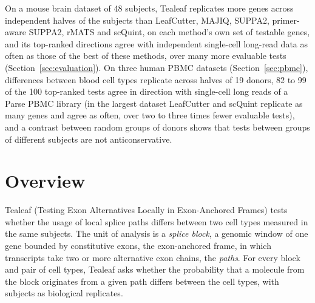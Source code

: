 \documentclass[11pt]{article}
\begin{document}
On a mouse brain dataset of 48 subjects, Tealeaf replicates more genes across independent halves of the subjects than LeafCutter, MAJIQ, SUPPA2, primer-aware SUPPA2, rMATS and scQuint, on each method's own set of testable genes, and its top-ranked directions agree with independent single-cell long-read data as often as those of the best of these methods, over many more evaluable tests (Section~\ref{sec:evaluation}). On three human PBMC datasets (Section~\ref{sec:pbmc}), differences between blood cell types replicate across halves of 19 donors, 82 to 99 of the 100 top-ranked tests agree in direction with single-cell long reads of a Parse PBMC library (in the largest dataset LeafCutter and scQuint replicate as many genes and agree as often, over two to three times fewer evaluable tests), and a contrast between random groups of donors shows that tests between groups of different subjects are not anticonservative.

\section{Overview}

Tealeaf (Testing Exon Alternatives Locally in Exon-Anchored Frames) tests whether the usage of local splice paths differs between two cell types measured in the same subjects. The unit of analysis is a \emph{splice block}, a genomic window of one gene bounded by constitutive exons, the exon-anchored frame, in which transcripts take two or more alternative exon chains, the \emph{paths}. For every block and pair of cell types, Tealeaf asks whether the probability that a molecule from the block originates from a given path differs between the cell types, with subjects as biological replicates.
\end{document}
